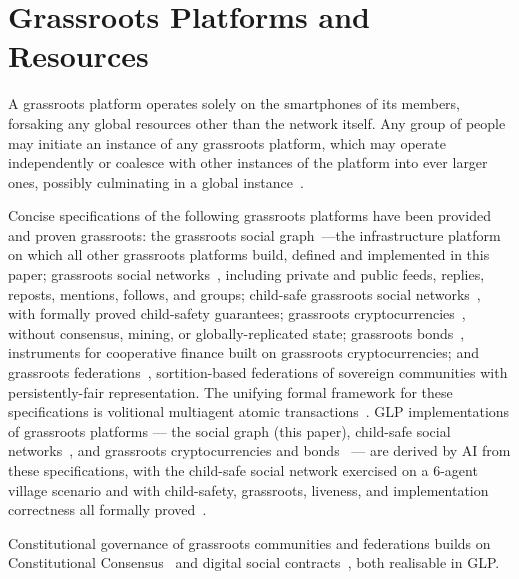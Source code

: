 \section{Grassroots Platforms and Resources}\label{section:platforms}

A grassroots platform operates solely on the smartphones of its members, forsaking any global resources other than the network itself.  Any group of people may initiate an instance of any grassroots platform, which may operate independently or coalesce with other instances of the platform into ever larger ones, possibly culminating in a global instance~\cite{shapiro2023grassrootsBA,shapiro2024grassroots,shapiro2025atomic,shapiro2025characterising,lewis2026volitional}.

Concise specifications of the following grassroots platforms have been provided and proven grassroots: the grassroots social graph~\cite{shapiro2023gsn,shapiro2025atomic,lewis2026volitional}---the infrastructure platform on which all other grassroots platforms build, defined and implemented in this paper; grassroots social networks~\cite{shapiro2023gsn}, including private and public feeds, replies, reposts, mentions, follows, and groups; child-safe grassroots social networks~\cite{shapiro2026cssn}, with formally proved child-safety guarantees; grassroots cryptocurrencies~\cite{shapiro2024gc,lewis2023grassroots}, without consensus, mining, or globally-replicated state; grassroots bonds~\cite{shapiro2026bonds}, instruments for cooperative finance built on grassroots cryptocurrencies; and grassroots federations~\cite{shapiro2025GF,halpern2024federated}, sortition-based federations of sovereign communities with persistently-fair representation. The unifying formal framework for these specifications is volitional multiagent atomic transactions~\cite{lewis2026volitional}. GLP implementations of grassroots platforms --- the social graph (this paper), child-safe social networks~\cite{shapiro2026cssn}, and grassroots cryptocurrencies and bonds~\cite{shapiro2026bonds} --- are derived by AI from these specifications, with the child-safe social network exercised on a 6-agent village scenario and with child-safety, grassroots, liveness, and implementation correctness all formally proved~\cite{shapiro2026cssn}.

Constitutional governance of grassroots communities and federations builds on Constitutional Consensus~\cite{keidar2025constitutional,lewis2025morpheus} and digital social contracts~\cite{cardelli2020digital,shapiro2022foundations}, both realisable in GLP.

